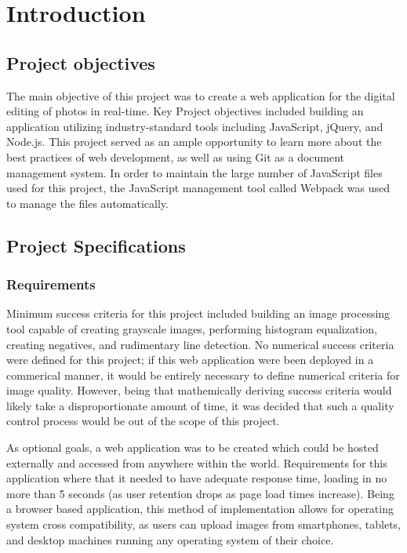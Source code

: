 \documentclass{article}
\let\Oldsection\section
\renewcommand{\section}{\FloatBarrier\Oldsection}
\let\Oldsubsection\subsection
\renewcommand{\subsection}{\FloatBarrier\Oldsubsection}
\let\Oldsubsubsection\subsubsection
\renewcommand{\subsubsection}{\FloatBarrier\Oldsubsubsection}
\begin{document}
  \newpage

  \section{Introduction}

  \subsection{Project objectives}

  The main objective of this project was to create a web application for the digital editing of photos in real-time. Key Project objectives included building an application utilizing industry-standard tools including JavaScript, jQuery, and Node.js. This project served as an ample opportunity to learn more about the best practices of web development, as well as using Git as a document management system. In order to maintain the large number of JavaScript files used for this project, the JavaScript management tool called Webpack was used to manage the files automatically.

  \subsection{Project Specifications}

  \subsubsection{Requirements}

  Minimum success criteria for this project included building an image processing tool capable of creating grayscale images, performing histogram equalization, creating negatives, and rudimentary line detection. No numerical success criteria were defined for this project; if this web application were been deployed in a commerical manner, it would be entirely necessary to define numerical criteria for image quality. However, being that mathemically deriving success criteria would likely take a disproportionate amount of time, it was decided that such a quality control process would be out of the scope of this project.
  
  As optional goals, a web application was to be created which could be hosted externally and accessed from anywhere within the world. Requirements for this application where that it needed to have adequate response time, loading in no more than 5 seconds (as user retention drops as page load times increase). Being a browser based application, this method of implementation allows for operating system cross compatibility, as users can upload images from smartphones, tablets, and desktop machines running any operating system of their choice.
  
\end{document}
